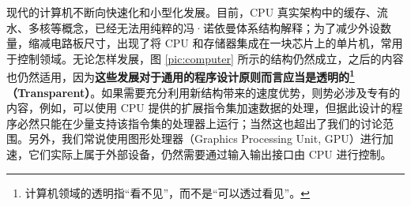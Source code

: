 现代的计算机不断向快速化和小型化发展。目前，CPU 真实架构中的缓存、流水、多核等概念，已经无法用纯粹的冯·诺依曼体系结构解释；为了减少外设数量，缩减电路板尺寸，出现了将 CPU 和存储器集成在一块芯片上的单片机，常用于控制领域。无论怎样发展，图 \ref{pic:computer} 所示的结构仍然成立，之后的内容也仍然适用，因为\textbf{这些发展对于通用的程序设计原则而言应当是透明的\footnote{计算机领域的透明指“看不见”，而不是“可以透过看见”。}（Transparent）}。如果需要充分利用新结构带来的速度优势，则势必涉及专有的内容，例如，可以使用 CPU 提供的扩展指令集加速数据的处理，但据此设计的程序必然只能在少量支持该指令集的处理器上运行；当然这也超出了我们的讨论范围。另外，我们常说使用图形处理器（Graphics Processing Unit, GPU）进行加速，它们实际上属于外部设备，仍然需要通过输入输出接口由 CPU 进行控制。

\clearpage